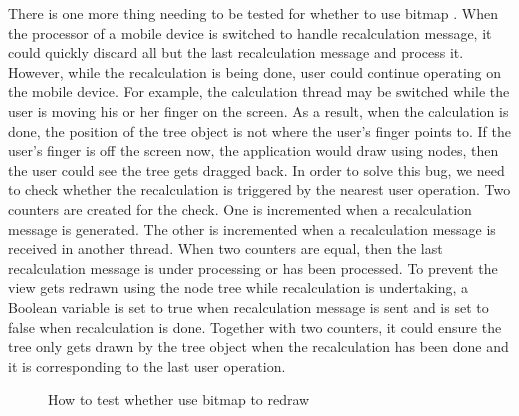 \documentclass[MSc]{icldt}
\begin{document}
There is one more thing needing to be tested for whether to use bitmap . When the processor of a mobile device is switched to handle recalculation message, it could quickly discard all but the last recalculation message and process it. However, while the recalculation is being done, user could continue operating on the mobile device. For example, the calculation thread may be switched while the user is moving his or her finger on the screen. As a result, when the calculation is done, the position of the tree object is not where the user's finger points to. If the user's finger is off the screen now, the application would draw using nodes, then the user could see the tree gets dragged back. In order to solve this bug, we need to check whether the recalculation is triggered by the nearest user operation. Two counters are created for the check. One is incremented when a recalculation message is generated. The other is incremented when a recalculation message is received in another thread. When two counters are equal, then the last recalculation message is under processing or has been processed. To prevent the view gets redrawn using the node tree while recalculation is undertaking, a Boolean variable is set to true when recalculation message is sent and is set to false when recalculation is done. Together with two counters, it could ensure the tree only gets drawn by the tree object when the recalculation has been done and it is corresponding to the last user operation. 

\begin{figure}[H]
\caption{How to test whether use bitmap to redraw}
\end{figure}
\end{document}
